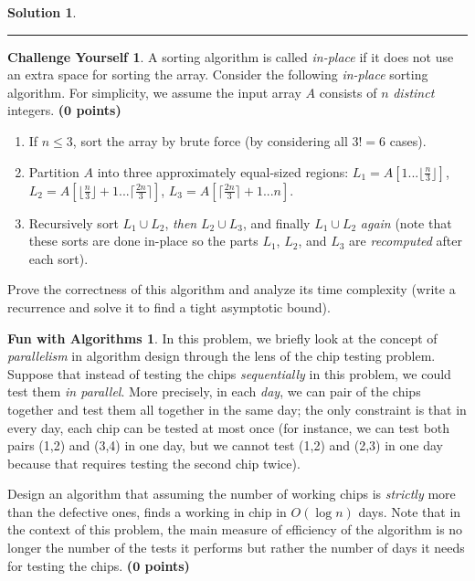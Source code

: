 \documentclass{article}
\theoremstyle{definition}
\newtheorem*{fun}{Fun with Algorithms}
\newtheorem*{challenge}{Challenge Yourself}
\def\fline{\rule{0.75\linewidth}{0.5pt}}
\newcommand{\finishline}{\begin{center}\fline\end{center}}
\newtheorem*{solution*}{Solution}
\newenvironment{solution}{\begin{solution*}}{{\finishline} \end{solution*}}
\newcommand{\grade}[1]{\hfill{\textbf{($\mathbf{#1}$ points)}}}
\begin{document}
\begin{solution}
\end{solution}

\smallskip



\begin{challenge}
	A sorting algorithm is called \emph{in-place} if it does not use an extra space for sorting the array. 
	Consider the following \emph{in-place} sorting algorithm. For simplicity, we assume the input array $A$ consists of $n$ \emph{distinct} integers.  \grade{0} 
	\begin{enumerate}
	\item If $n \leq 3$, sort the array by brute force (by considering all $3!=6$ cases). 
	\item Partition $A$ into three approximately equal-sized regions: $L_1 = A[1...\lfloor \frac{n}{3}\rfloor]$, $L_2 = A[\lfloor \frac{n}{3}\rfloor+1...\lceil \frac{2n}{3}\rceil]$, $L_3 = A[\lceil \frac{2n}{3}\rceil+1...n]$. 
	\item Recursively sort $L_1 \cup L_2$, \emph{then} $L_2 \cup L_3$, and finally $L_1 \cup L_2$ \emph{again} (note that these sorts are done in-place so the parts $L_1$, $L_2$, and $L_3$ are \emph{recomputed} after each sort). 
	\end{enumerate}
	Prove the correctness of this algorithm and analyze its time complexity (write a recurrence and solve it to find a tight asymptotic bound).
\end{challenge}

\begin{fun}
	In this problem, we briefly look at the concept of \emph{parallelism} in algorithm design through the lens of the chip testing problem. Suppose that instead of testing the chips \emph{sequentially} in this problem, 
	we could test them \emph{in parallel}. More precisely, in each \emph{day}, we can pair of the chips together and test them all together in the same day; the only constraint is that in every day, each chip can be tested at most once (for instance, we can test both pairs 
	(1,2) and (3,4) in one day, but we cannot test (1,2) and (2,3) in one day because that requires testing the second chip twice). 
	
	Design an algorithm that assuming the number of working chips is \emph{strictly} more than the defective ones, finds a working in chip in $O(\log{n})$ days. Note that in the context of this problem, the main measure of efficiency of the algorithm is no longer 
	the number of the tests it performs but rather the number of days it needs for testing the chips. \grade{0}
\end{fun}
\end{document}
